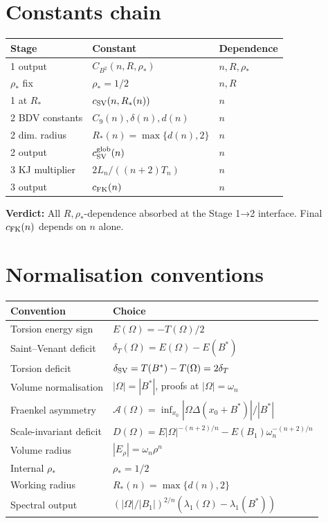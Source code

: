 \documentclass[11pt]{article}
\theoremstyle{definition}
\newcommand{\Fr}{\mathcal{A}}
\newcommand{\Om}{\Omega}
\newcommand{\rstar}{\rho_{*}}
\newcommand{\Bstar}{B^{*}}
\begin{document}
\section{Constants chain}\label{sec:constants}

\renewcommand{\arraystretch}{1.25}
\begin{center}
\begin{tabular}{|l|l|l|}
\hline
Stage & Constant & Dependence \\\hline
1 output & $C_{B^2}(n,R,\rstar)$ & $n,R,\rstar$ \\
$\rstar$ fix & $\rstar=1/2$ & $n,R$ \\
1 at $R_*$ & $c_{\rm SV}(n,R_*(n))$ & $n$ \\
2 BDV constants & $C_9(n),\delta(n),d(n)$ & $n$ \\
2 dim. radius & $R_*(n)=\max\{d(n),2\}$ & $n$ \\
2 output & $c_{\rm SV}^{\rm glob}(n)$ & $n$ \\
3 KJ multiplier & $2L_n/((n+2)T_n)$ & $n$ \\
3 output & $c_{\rm FK}(n)$ & $n$ \\\hline
\end{tabular}
\end{center}

\textbf{Verdict:} All $R,\rstar$-dependence absorbed at the Stage 1→2
interface. Final $c_{\rm FK}(n)$ depends on $n$ alone.

\section{Normalisation conventions}\label{sec:norms}

\renewcommand{\arraystretch}{1.25}
\begin{center}
\begin{tabular}{|l|l|}\hline
Convention & Choice \\\hline
Torsion energy sign & $E(\Om)=-T(\Om)/2$ \\
Saint--Venant deficit & $\delta_T(\Om)=E(\Om)-E(\Bstar)$ \\
Torsion deficit & $\delta_{\rm SV}=T(\Bstar)-T(\Om)=2\delta_T$ \\
Volume normalisation & $|\Om|=|\Bstar|$, proofs at $|\Om|=\omega_n$ \\
Fraenkel asymmetry & $\Fr(\Om)=\inf_{x_0}|\Om\Delta(x_0+\Bstar)|/|\Bstar|$ \\
Scale-invariant deficit & $D(\Om)=E|\Om|^{-(n+2)/n}-E(B_1)\omega_n^{-(n+2)/n}$ \\
Volume radius & $|E_\rho|=\omega_n\rho^n$ \\
Internal $\rstar$ & $\rstar=1/2$ \\
Working radius & $R_*(n)=\max\{d(n),2\}$ \\
Spectral output & $(|\Om|/|B_1|)^{2/n}(\lambda_1(\Om)-\lambda_1(\Bstar))$ \\\hline
\end{tabular}
\end{center}
\end{document}
